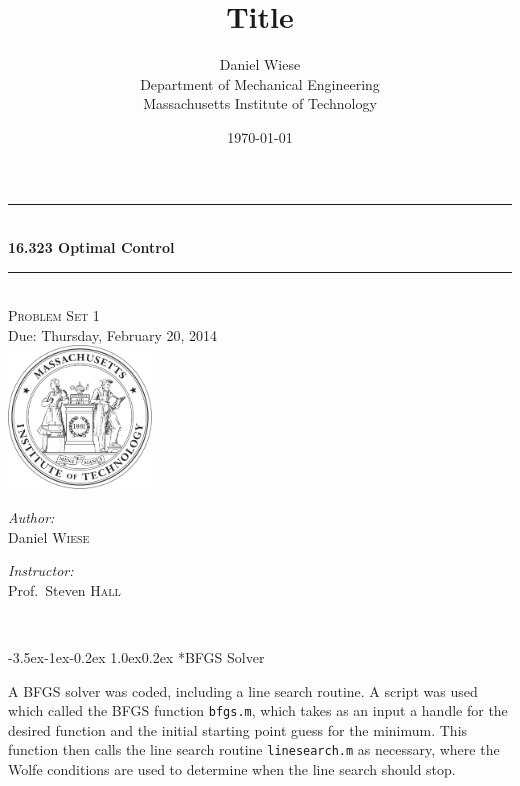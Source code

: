 \documentclass[11pt,letterpaper,onecolumn,notitlepage]{article}
\title{\textbf{Title}}
\author{Daniel Wiese \\ Department of Mechanical Engineering \\ Massachusetts Institute of Technology}
\date{\today}
\makeatletter
\renewcommand\section{\@startsection{section}{1}{\z@}%
{-3.5ex\@plus-1ex\@minus-0.2ex}%
{1.0ex\@plus0.2ex}%
{\fontsize{12pt}{12pt}\selectfont\bfseries\sffamily}}
\makeatother
\begin{document}
  \begin{titlepage}
    \begin{center}
      \rule{\linewidth}{0.01in} \\[0.25in]
      {\huge\bfseries 16.323 Optimal Control} \\[0.4cm]
      \rule{\linewidth}{0.01in} \\[0.25in]

      \textsc{\LARGE Problem Set 1} \\[0.15in]
      \large Due: Thursday, February 20, 2014 \\[1.0in]
      \includegraphics[width=1.5in]{../fig/mit-seal.pdf} \\[3.0in]

      \begin{minipage}{0.4\textwidth}
        \begin{flushleft} \large
          \emph{Author:}\\
          Daniel \textsc{Wiese}
          \vfill
        \end{flushleft}
      \end{minipage}
      \begin{minipage}{0.4\textwidth}
        \begin{flushright} \large
          \emph{Instructor:} \\
          Prof.~Steven \textsc{Hall} \\
        \end{flushright}
      \end{minipage} \\
      \vfill
    \end{center}
  \end{titlepage}

  \clearpage
  \section*{BFGS Solver}

  A BFGS solver was coded, including a line search routine.
  A script was used which called the BFGS function \texttt{bfgs.m}, which takes as an input a handle for the desired function and the initial starting point guess for the minimum.
  This function then calls the line search routine \texttt{linesearch.m} as necessary, where the Wolfe conditions are used to determine when the line search should stop.
\end{document}
